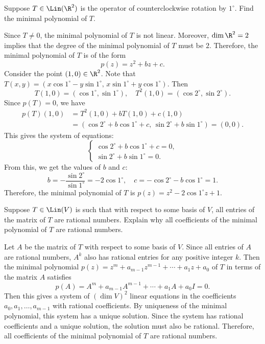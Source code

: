 \begin{exercise}
Suppose $T\in\Lin(\R^2)$ is the operator of counterclockwise rotation by
$1^\circ$. Find the minimal polynomial of $T$.
\end{exercise}
\begin{solution}
Since $T\ne0$, the minimal polynomial of $T$ is not linear. Moreover,
$\dim\R^2=2$ implies that the degree of the minimal polynomial of $T$ must be
$2$. Therefore, the minimal polynomial of $T$ is of the form
\[ p(z)=z^2+bz+c. \]
Consider the point $(1,0)\in\R^2$. Note that
$T(x,y)=(x\cos1^\circ-y\sin1^\circ,\,x\sin1^\circ+y\cos1^\circ)$. Then
\[ T(1,0)=(\cos1^\circ,\sin1^\circ),\quad T^2(1,0)=(\cos2^\circ,\sin2^\circ). \]
Since $p(T)=0$, we have
\begin{align*}
p(T)(1,0) &= T^2(1,0)+bT(1,0)+c(1,0)\\
          &= (\cos2^\circ+b\cos1^\circ+c,\,\sin2^\circ+b\sin1^\circ)=(0,0).
\end{align*}
This gives the system of equations:
\[ \begin{cases} \cos2^\circ+b\cos1^\circ+c=0,\\
   \sin2^\circ+b\sin1^\circ=0. \end{cases} \]
From this, we get the values of $b$ and $c$:
\[ b=-\frac{\sin2^\circ}{\sin1^\circ}=-2\cos1^\circ,\quad
   c=-\cos2^\circ-b\cos1^\circ=1. \]
Therefore, the minimal polynomial of $T$ is $p(z)=z^2-2\cos1^\circ z+1$.
\end{solution}

\begin{exercise}
Suppose $T\in\Lin(V)$ is such that with respect to some basis of $V$, all
entries of the matrix of $T$ are rational numbers. Explain why all
coefficients of the minimal polynomial of $T$ are rational numbers.
\end{exercise}
\begin{solution}
Let $A$ be the matrix of $T$ with respect to some basis of $V$. Since all
entries of $A$ are rational numbers, $A^k$ also has rational entries for any
positive integer $k$. Then the minimal polynomial
$p(z)=z^m+a_{m-1}z^{m-1}+\cdots+a_1z+a_0$ of $T$ in terms of the matrix $A$
satisfies
\[ p(A)=A^m+a_{m-1}A^{m-1}+\cdots+a_1A+a_0I=0. \]
Then this gives a system of $(\dim V)^2$ linear equations in the coefficients
$a_0,a_1,\allowbreak\dots,a_{m-1}$ with rational coefficients. By uniqueness of the
minimal polynomial, this system has a unique solution. Since the system has
rational coefficients and a unique solution, the solution must also be
rational. Therefore, all coefficients of the minimal polynomial of $T$ are
rational numbers.
\end{solution}

